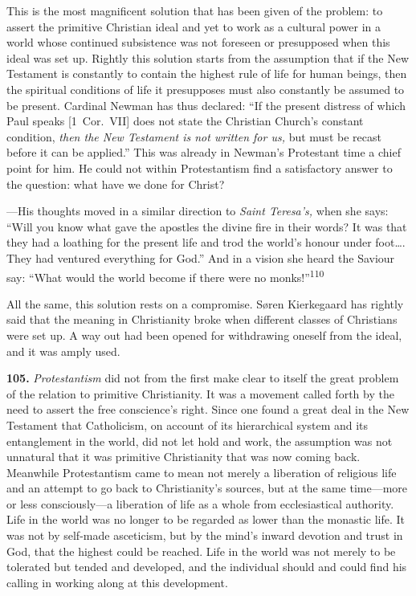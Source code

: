 \documentclass[12pt,a4paper]{book}
\newcommand{\opage}[1]{\marginnote{\footnotesize\textit{[#1]}}}
\begin{document}
This is the most magnificent solution that has been given of the problem: to assert the primitive Christian ideal
and yet to work as a cultural power in a world whose continued subsistence was not foreseen or presupposed when
this ideal was set up. Rightly this solution starts from the assumption that if the New Testament is constantly to
contain the highest rule of life for human beings, then the spiritual conditions of life it presupposes must also
constantly be assumed to be present. Cardinal Newman has thus declared: ``If the present distress of which Paul
speaks [1~Cor.\ VII] does not state the Christian Church's constant condition, \emph{then the New Testament is not
written for us,} but must be recast before it can be applied.'' This was already in Newman's Protestant time a
chief point for him. He could not within Protestantism find a satisfactory answer to the question: what have we
done for Christ?

---His thoughts moved in a similar direction to \emph{Saint Teresa's,} when she says: ``Will you know what gave the
apostles the divine fire in their words? It was that they had a loathing for the present life and trod the world's
honour under foot\ldots. They had ventured everything for God.'' And in a vision she heard the Saviour say: ``What
would the world become if there were no monks!''\textsuperscript{110}

All the same, this solution rests on a compromise. Søren Kierkegaard has rightly said that the meaning in
Christianity broke when different classes of Christians were set up. A way out had been opened for withdrawing
oneself from the ideal, and it was amply used.

\medskip

\noindent\textbf{105.} \emph{Protestantism} did not from the first make clear to itself the great problem of the
relation to primitive Christianity. It was a movement called forth by the need to assert the free conscience's
right. Since one found a great deal in the New Testament that Catholicism, on account of its hierarchical system
and its entanglement in the world, did not let hold and work, the assumption was not unnatural that it was
primitive Christianity that was now coming back. Meanwhile Protestantism came to mean not merely a liberation of
religious life and an attempt to go back to Christianity's sources, but at the same time---more or less
consciously---a liberation of life as a whole from ecclesiastical authority. Life in the world was no longer to be
regarded as lower than the monastic life. It was not by self-made asceticism, but 
\opage{234}by the mind's inward devotion and
trust in God, that the highest could be reached. Life in the world was not merely to be tolerated but tended and
developed, and the individual should and could find his calling in working along at this development.
\end{document}
